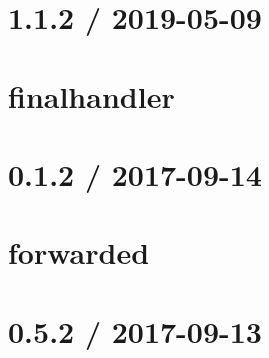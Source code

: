 \let\mypdfximage\pdfximage\def\pdfximage{\immediate\mypdfximage}\documentclass[twoside]{book}
\newcommand{\+}{\discretionary{\mbox{\scriptsize$\hookleftarrow$}}{}{}}
\begin{document}
\chapter{1.1.2 / 2019-\/05-\/09}
\label{md__c_1__git_hub__p_r_o_y_e_c_t_o-_i_i_i-_g_o_t_rest-api-node-mysql_node_modules_finalhandler__h_i_s_t_o_r_y}

\chapter{finalhandler}
\label{md__c_1__git_hub__p_r_o_y_e_c_t_o-_i_i_i-_g_o_t_rest-api-node-mysql_node_modules_finalhandler__r_e_a_d_m_e}

\chapter{0.1.2 / 2017-\/09-\/14}
\label{md__c_1__git_hub__p_r_o_y_e_c_t_o-_i_i_i-_g_o_t_rest-api-node-mysql_node_modules_forwarded__h_i_s_t_o_r_y}

\chapter{forwarded}
\label{md__c_1__git_hub__p_r_o_y_e_c_t_o-_i_i_i-_g_o_t_rest-api-node-mysql_node_modules_forwarded__r_e_a_d_m_e}

\chapter{0.5.2 / 2017-\/09-\/13}
\label{md__c_1__git_hub__p_r_o_y_e_c_t_o-_i_i_i-_g_o_t_rest-api-node-mysql_node_modules_fresh__h_i_s_t_o_r_y}

\end{document}
